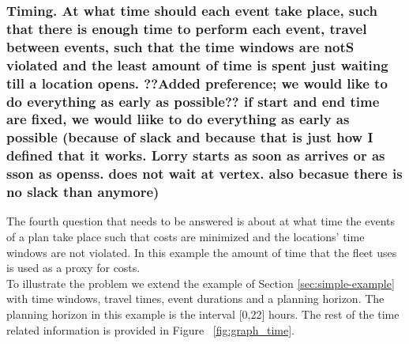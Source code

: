 \subsubsection{Timing.
At what time should each event take place, such that there is enough time to perform each event, travel between events, such that the time windows are notS violated and the least amount of time is spent just waiting till a location opens. ??Added preference; we would like to do everything as early as possible?? if start and end time are fixed, we would liike to do everything as early as possible (because of slack and because that is just how I defined that it works. Lorry starts as soon as arrives or as sson as openss. does not wait at vertex. also becasue there is no slack than anymore) }




The fourth question that needs to be answered is about at what time the events of a plan  take place such that costs are minimized and the locations' time windows are not violated. In this example the amount of time that the fleet uses is used as a proxy for costs.
\\

To illustrate the problem we extend the example of Section \ref{sec:simple-example} with time windows, travel times, event durations and a planning horizon.
The planning horizon in this example is the interval [0,22] hours.
The rest of the time related information is provided in Figure ~\ref{fig:graph_time}. \\


